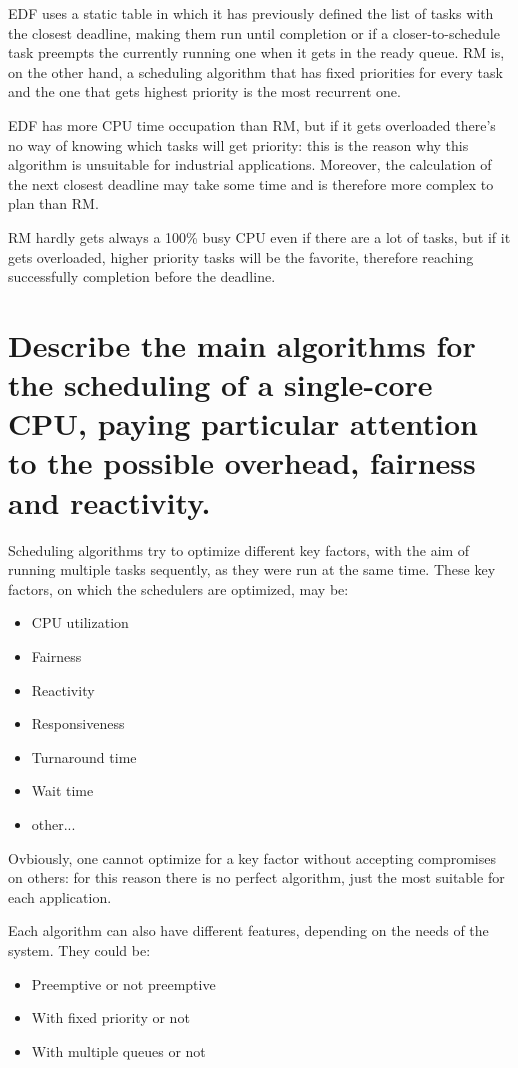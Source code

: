 EDF uses a static table in which it has previously defined the list of tasks with the closest deadline, making them run until completion or if a closer-to-schedule task preempts the currently running one when it gets in the ready queue. 
RM is, on the other hand, a scheduling algorithm that has fixed priorities for every task and the one that gets highest priority is the most recurrent one.

EDF has more CPU time occupation than RM, but if it gets overloaded there's no way of knowing which tasks will get priority: this is the reason why this algorithm is unsuitable for industrial applications. Moreover, the calculation of the next closest deadline may take some time and is therefore more complex to plan than RM.

RM hardly gets always a 100\% busy CPU even if there are a lot of tasks, but if it gets overloaded, higher priority tasks will be the favorite, therefore reaching successfully completion before the deadline.

\section{Describe the main algorithms for the scheduling of a single-core CPU, paying particular attention to the possible overhead, fairness and reactivity.}

Scheduling algorithms try to optimize different key factors, with the aim of running multiple tasks sequently, as they were run at the same time.
These key factors, on which the schedulers are optimized, may be:
\begin{itemize}
	\item CPU utilization
	\item Fairness
	\item Reactivity
	\item Responsiveness
	\item Turnaround time
	\item Wait time
	\item other...
\end{itemize}

Ovbiously, one cannot optimize for a key factor without accepting compromises on others: for this reason there is no perfect algorithm, just the most suitable for each application.

Each algorithm can also have different features, depending on the needs of the system. They could be:
\begin{itemize}
	\item Preemptive or not preemptive
	\item With fixed priority or not
	\item With multiple queues or not
\end{itemize}

